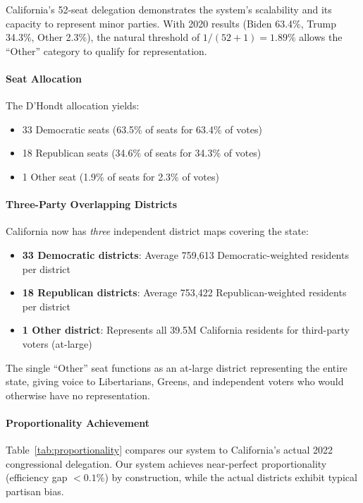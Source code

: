 California's 52-seat delegation demonstrates the system's scalability and its capacity to represent minor parties. With 2020 results (Biden 63.4\%, Trump 34.3\%, Other 2.3\%), the natural threshold of $1/(52+1) = 1.89\%$ allows the ``Other'' category to qualify for representation.

\paragraph{Seat Allocation}
The D'Hondt allocation yields:
\begin{itemize}
    \item 33 Democratic seats (63.5\% of seats for 63.4\% of votes)
    \item 18 Republican seats (34.6\% of seats for 34.3\% of votes)
    \item 1 Other seat (1.9\% of seats for 2.3\% of votes)
\end{itemize}

\paragraph{Three-Party Overlapping Districts}
California now has \emph{three} independent district maps covering the state:

\begin{itemize}
    \item \textbf{33 Democratic districts}: Average 759,613 Democratic-weighted residents per district
    \item \textbf{18 Republican districts}: Average 753,422 Republican-weighted residents per district
    \item \textbf{1 Other district}: Represents all 39.5M California residents for third-party voters (at-large)
\end{itemize}

The single ``Other'' seat functions as an at-large district representing the entire state, giving voice to Libertarians, Greens, and independent voters who would otherwise have no representation.

\paragraph{Proportionality Achievement}
Table~\ref{tab:proportionality} compares our system to California's actual 2022 congressional delegation. Our system achieves near-perfect proportionality (efficiency gap $< 0.1\%$) by construction, while the actual districts exhibit typical partisan bias.

